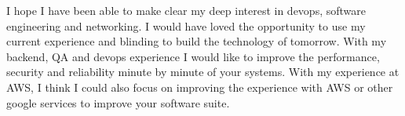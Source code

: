 \documentclass[../../main.tex]{subfiles}
\begin{document}
I hope I have been able to make clear my deep interest in devops, software engineering and networking. I would have loved the opportunity to use my current experience and blinding to build the technology of tomorrow. With my backend, QA and devops experience I would like to improve the performance, security and reliability minute by minute of your systems. With my experience at AWS, I think I could also focus on improving the experience with AWS or other google services to improve your software suite.
\\
\end{document}
